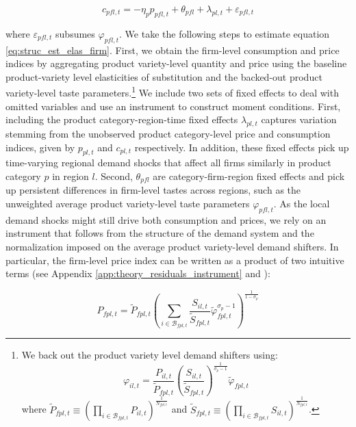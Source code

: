 \begin{linenomath*}
    \begin{equation}\label{eq:struc_est_elas_firm}
        c_{pfl,t} = - \eta_{p} p_{pfl,t} + \theta_{pfl} + \lambda_{pl,t} + \varepsilon_{pfl,t}
    \end{equation}
\end{linenomath*}
\noindent where $\varepsilon_{pfl,t}$ subsumes $\varphi_{pfl,t}$. We take the following steps to estimate equation \ref{eq:struc_est_elas_firm}. First, we obtain the firm-level consumption and price indices by aggregating product variety-level quantity and price using the baseline product-variety level elasticities of substitution and the backed-out product variety-level taste parameters.\footnote{We back out the product variety level demand shifters using: $$\varphi_{il,t} =  \frac{P_{il,t}}{\tilde{P}_{fpl,t}}\left(\frac{S_{il,t}}{\tilde{S}_{fpl,t}}\right)^{\frac{1}{\sigma_p-1}}\tilde{\varphi}_{fpl,t}$$ where $\tilde{P}_{fpl,t} \equiv \left(\prod_{i \in \mathcal{B}_{fpl,t}} P_{il,t}\right)^{\frac{1}{N_{fpl,t}}}$ and $\tilde{S}_{fpl,t} \equiv \left(\prod_{i \in \mathcal{B}_{fpl,t}} S_{il,t}\right)^{\frac{1}{N_{fpl,t}}}$.} We include two sets of fixed effects to deal with omitted variables and use an instrument to construct moment conditions. First, including the product category-region-time fixed effects $\lambda_{pl,t}$ captures variation stemming from the unobserved product category-level price and consumption indices, given by $p_{pl,t}$ and $c_{pl,t}$ respectively. In addition, these fixed effects pick up time-varying regional demand shocks that affect all firms similarly in product category $p$ in region $l$. Second, $\theta_{pfl}$ are category-firm-region fixed effects and pick up persistent differences in firm-level tastes across regions, such as the unweighted average product variety-level taste parameters $\varphi_{pfl,t}$. As the local demand shocks might still drive both consumption and prices, we rely on an instrument that follows from the structure of the demand system and the normalization imposed on the average product variety-level demand shifters. In particular, the firm-level price index can be written as a product of two intuitive terms (see Appendix \ref{app:theory_residuals_instrument} and \citet{Hottman2016}): 
\begin{linenomath*}
    \begin{equation*}
        P_{fpl,t} = \tilde{P}_{fpl,t} 
                    \left(
                        \sum_{i \in \mathcal{B}_{fpl,t}} \frac{S_{il,t}}{\tilde{S}_{fpl,t}} \tilde{\varphi}_{fpl,t}^{\sigma_p-1}
                    \right)^{\frac{1}{1-\sigma_p}}
    \end{equation*}
\end{linenomath*}
